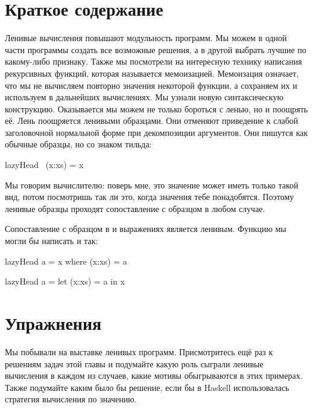 \section{Краткое содержание}

Ленивые вычисления повышают модульность программ. 
Мы можем в одной части программы создать все возможные
решения, а в другой выбрать лучшие по какому-либо признаку.
Также мы посмотрели на интересную технику написания 
рекурсивных функций, которая называется мемоизацией. 
Мемоизация означает, что мы не вычисляем повторно значения 
некоторой функции, а сохраняем их и используем в дальнейших
вычислениях. 
Мы узнали новую синтаксическую конструкцию.
Оказывается мы можем не только бороться с ленью, но и поощрять её.
Лень поощряется ленивыми образцами. Они отменяют приведение
к слабой заголовочной нормальной форме при декомпозиции
аргументов. Они пишутся как обычные образцы, но со знаком тильда:

\begin{code}
lazyHead ~(x:xs) = x
\end{code}

Мы говорим вычислителю: поверь мне, это значение может иметь
только такой вид, потом посмотришь так ли это, когда
значения тебе понадобятся. Поэтому ленивые образцы проходят 
сопоставление с образцом в любом случае. 

Сопоставление с образцом в  и  
выражениях является ленивым. Функцию  
мы могли бы написать и так:

\begin{code}
lazyHead a = x
    where (x:xs) = a

lazyHead a = 
    let (x:xs) = a
    in  x
\end{code}


\section{Упражнения}

Мы побывали на выставке ленивых программ.
Присмотритесь ещё раз к решениям задач этой главы
и подумайте какую роль сыграли ленивые вычисления
в каждом из случаев, какие мотивы обыгрываются в этих примерах.
Также подумайте каким было бы решение, если бы в Haskell
использовалась стратегия вычисления по значению.

